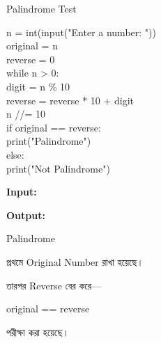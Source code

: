 \begin{codeoutputbox}{Palindrome Test}

\noindent
\begin{minipage}[t]{0.55\linewidth}
\codeheading

\begin{english}
\ttfamily
n = int(input("Enter a number: "))\\
original = n\\
reverse = 0\\[0.5mm]
while n > 0:\\
\hspace*{4mm}digit = n \% 10\\
\hspace*{4mm}reverse = reverse * 10 + digit\\
\hspace*{4mm}n //= 10\\[0.5mm]
if original == reverse:\\
\hspace*{4mm}print("Palindrome")\\
else:\\
\hspace*{4mm}print("Not Palindrome")
\end{english}

\end{minipage}
\hfill
\begin{minipage}[t]{0.41\linewidth}
\outputheading

\textbf{Input:}
\textenglish{}

\medskip

\textbf{Output:}

\textenglish{\ttfamily Palindrome}

\medskip

প্রথমে Original Number রাখা হয়েছে।

তারপর Reverse বের করে—

\begin{center}
\textenglish{\ttfamily original == reverse}
\end{center}

পরীক্ষা করা হয়েছে।

\end{minipage}

\end{codeoutputbox}



